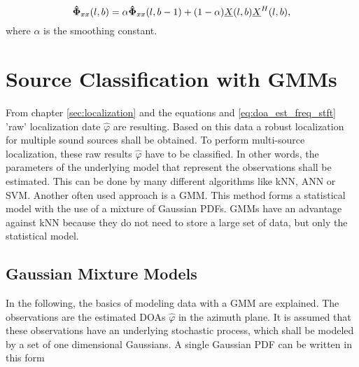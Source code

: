 \begin{equation}
\mathbf{\hat{\Phi}}_{xx}(l,b) = \alpha \mathbf{\hat{\Phi}}_{xx}(l,b-1)+(1-\alpha)\underline{X}(l,b)\underline{X}^H(l,b),
\label{eq:cross_iir}
\end{equation}
where $\alpha$ is the smoothing constant.




\section{Source Classification with GMMs}
\label{sec:source_classification}
From chapter \ref{sec:localization} and the equations \label{eq:doa_est_broad_stft} and \ref{eq:doa_est_freq_stft} 'raw' localization date $\hat \varphi$ are resulting. Based on this data a robust localization for multiple sound sources shall be obtained. To perform multi-source localization, these raw results $\hat \varphi$ have to be classified. In other words, the parameters of the underlying model that represent the observations shall be estimated. This can be done by many different algorithms like \ac{kNN}, \ac{ANN} or \ac{SVM}. Another often used approach is a \ac{GMM}. This method forms a statistical model with the use of a mixture of Gaussian \acp{PDF}. \acp{GMM} have an advantage against \ac{kNN} because they do not need to store a large set of data, but only the statistical model. \cite[Chapter~17.2.3]{martin2008advances} \\

\subsection{Gaussian Mixture Models}
\label{subsec:GMM}
In the following, the basics of modeling data with a GMM are explained. The observations are the estimated \acp{DOA} $\hat \varphi$ in the azimuth plane. It is assumed that these observations have an underlying stochastic process, which shall be modeled by a set of one dimensional Gaussians. A single Gaussian \ac{PDF} can be written in this form


